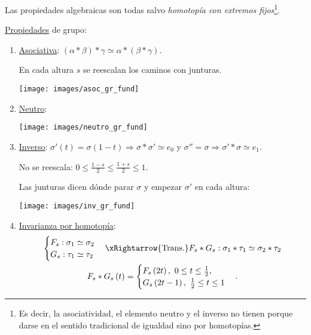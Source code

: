 Las propiedades algebraicas son todas salvo \textit{homotopía con extremos fijos}\footnote{Es decir, la asociatividad, el elemento neutro y el inverso no tienen porque darse en el sentido tradicional de igualdad sino por homotopías.}.
\begin{prop}
\underline{Propiedades} de grupo:
\begin{enumerate}
    \item \underline{Asociativa}: $\left( \alpha * \beta \right) * \gamma \simeq \alpha * \left( \beta * \gamma \right)$.

    En cada altura $s$ se reescalan los caminos con junturas.
    \begin{center}
        \texttt{[image: images/asoc\_gr\_fund]} 
    \end{center}
    \item \underline{Neutro}: 
    \begin{center}
        \texttt{[image: images/neutro\_gr\_fund]} 
    \end{center}
    \item \underline{Inverso}: $\sigma'\left( t \right) = \sigma\left( 1 - t \right) \Rightarrow \sigma * \sigma' \simeq e_0$ y $\sigma'' = \sigma \Rightarrow \sigma' * \sigma \simeq e_1$.

    No se reescala: $0 \le \frac{1 - s}{2} \le \frac{1 + s}{2} \le 1$. 

    Las junturas dicen dónde parar $\sigma$ y empezar $\sigma'$ en cada altura:
    \begin{center}
        \texttt{[image: images/inv\_gr\_fund]} 
    \end{center}

    \item \underline{Invarianza por homotopía}: 
    \begin{gather*}
        \begin{cases}
            F_s: \sigma_1 \simeq \sigma_2\\
            G_s: \tau_1 \simeq \tau_2
        \end{cases} \xRightarrow{\text{Trans.}} F_s * G_s: \sigma_1 * \tau_1 \simeq \sigma_2 * \tau_2\\
        F_s * G_s\left( t \right) = \begin{cases}
            F_s\left( 2t \right),\ 0 \le t \le \frac{1}{2},\\
            G_s\left( 2t - 1 \right),\ \frac{1}{2} \le t \le 1
        \end{cases} 
    .\end{gather*}

\end{enumerate}
\end{prop}

